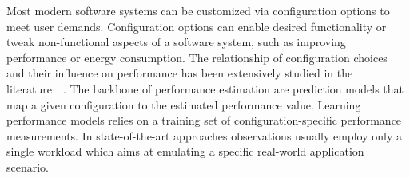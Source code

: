 
Most modern software systems can be customized via configuration options to meet user demands. Configuration options can enable desired functionality or tweak non-functional aspects of a software system, such as improving performance or energy consumption. The relationship of configuration choices and their influence on performance has been extensively studied in the literature~~\cite{dorn2020,siegmundPerformanceinfluenceModelsHighly2015,haDeepPerf2019,perfAL,guoVariabilityawarePerformancePrediction2013,sarkarCostEfficientSamplingPerformance,guo_2018_data,fourier_learning_2015,perLasso}. The backbone of performance estimation are prediction models that map a given configuration to the estimated performance value. Learning performance models relies on a training set of configuration-specific performance measurements. In state-of-the-art approaches observations usually employ only a single workload which aims at emulating a specific real-world application scenario.


